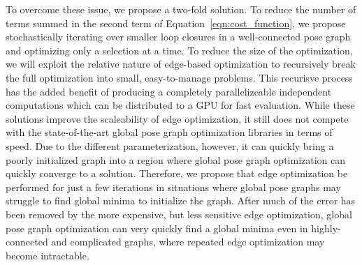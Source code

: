 To overcome these issue, we propose a two-fold solution.  To reduce the number of terms summed in the second term of Equation~\ref{eqn:cost_function}, we propose stochastically iterating over smaller loop closures in a well-connected pose graph and optimizing only a selection at a time.  To reduce the size of the optimization, we will exploit the relative nature of edge-based optimization to recursively break the full optimization into small, easy-to-manage problems.  This recurisve process has the added benefit of producing a completely parallelizeable independent computations which can be distributed to a GPU for fast evaluation.  While these solutions improve the scaleability of edge optimization, it still does not compete with the state-of-the-art global pose graph optimization libraries in terms of speed.  Due to the different parameterization, however, it can quickly bring a poorly initialized graph into a region where global pose graph optimization can quickly converge to a solution.  Therefore, we propose that edge optimization be performed for just a few iterations in situations where global pose graphs may struggle to find global minima to initialize the graph.  After much of the error has been removed by the more expensive, but less sensitive edge optimization, global pose graph optimization can very quickly find a global minima even in highly-connected and complicated graphs, where repeated edge optimization may become intractable.
